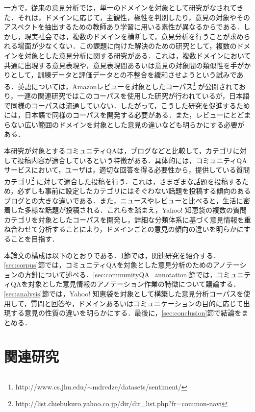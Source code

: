 \documentclass[japanese]{jnlp_1.4}
\begin{document}
一方で，従来の意見分析では，単一のドメインを対象として研究がなされてきた．それは，ドメインに応じて，主観性，極性を判別したり，意見の対象やそのアスペクトを抽出するための教師あり学習に用いる素性が異なるからである．しかし，現実社会では，複数のドメインを横断して，意見分析を行うことが求められる場面が少なくない．この課題に向けた解決のための研究として，複数のドメインを対象とした意見分析に関する研究\cite{blit2007acl,pono2012emnlp,he2011acl,bolle2011acl,li2012acl}がある．これは，複数ドメインにおいて共通に出現する意見表現や，意見表現間あるいは意見の対象間の類似性を手がかりとして，訓練データと評価データとの不整合を緩和させようという試みである．英語については，Amazonレビューを対象としたコーパス\footnote{http://www.cs.jhu.edu/$\sim$mdredze/datasets/sentiment/} が公開されており，一連の関連研究ではこのコーパスを使用した研究が行われているが，日本語で同様のコーパスは流通していない\cite{seki2013tod}．したがって，こうした研究を促進するためには，日本語で同様のコーパスを開発する必要がある．また，レビューにとどまらない広い範囲のドメインを対象とした意見の違いなども明らかにする必要がある．

本研究が対象とするコミュニティQAは，ブログなどと比較して，カテゴリに対して投稿内容が適合しているという特徴がある．具体的には，コミュニティQA サービスにおいて，ユーザは，適切な回答を得る必要性から，提供している質問カテゴリ\footnote{http://list.chiebukuro.yahoo.co.jp/dir/dir\_list.php?fr=common-navi} に対して適合した投稿を行う．これは，さまざまな話題を投稿するため，必ずしも事前に設定したカテゴリにはそぐわない話題を投稿する傾向のあるブログとの大きな違いである．また，ニュースやレビューと比べると，生活に密着した多様な話題が投稿される．これらを踏まえ，Yahoo! 知恵袋の複数の質問カテゴリを対象としたコーパスを開発し，詳細な分類体系に基づく意見情報を重ね合わせて分析することにより，ドメインごとの意見の傾向の違いを明らかにすることを目指す．

本論文の構成は以下のとおりである．\ref{sec:related}節では，関連研究を紹介する．\ref{sec:corpus}節では，コミュニティQAを対象とした意見分析のためのアノテーションの方針について述べる．\ref{sec:communityQA_annotation}節では，コミュニティQAを対象とした意見情報のアノテーション作業の特徴について議論する．\ref{sec:analysis}節では，Yahoo! 知恵袋を対象として構築した意見分析コーパスを使用して，質問と回答や，ドメインあるいはコミュニケーションの目的に応じて出現する意見の性質の違いを明らかにする．最後に，\ref{sec:conclusion}節で結論をまとめる．



\section{関連研究}
\label{sec:related}
\end{document}
